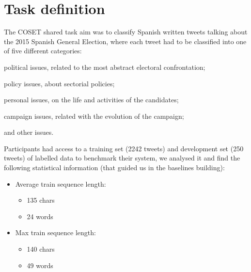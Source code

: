 \section{Task definition} \label{sec:task}

The COSET shared task aim was to classify Spanish written tweets talking about the 2015 Spanish General Election, where each tweet had to be classified into one of five different categories:
\begin{enumerate*}
\item political issues, related to the most abstract electoral confrontation; 
\item policy issues, about sectorial policies; 
\item personal issues, on the life and activities of the candidates; 
\item campaign issues, related with the evolution of the campaign;
\item and other issues.
\end{enumerate*}

Participants had access to a training set (2242 tweets) and development set (250 tweets) of labelled data to benchmark their system, we analysed it and find the following statistical information (that guided us in the baselines building):
\begin{multicols}{2}
\begin{itemize}
	\item Average train sequence length:
	\begin{itemize}
		\item 135 chars 
		\item 24 words
	\end{itemize}
	\item Max train sequence length: 
	\begin{itemize}
		\item 140 chars
		\item 49 words
	\end{itemize}
\end{itemize}
\end{multicols}